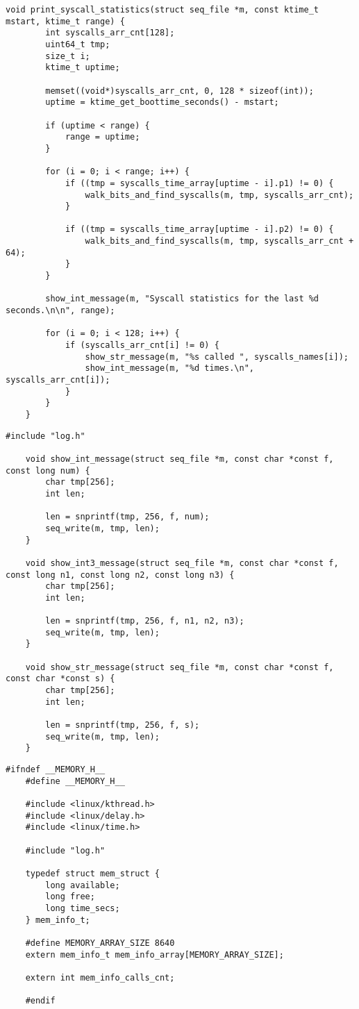 \begin{lstlisting}[caption={листинг файла stat.c}]
	void print_syscall_statistics(struct seq_file *m, const ktime_t mstart, ktime_t range) {
		int syscalls_arr_cnt[128];
		uint64_t tmp;
		size_t i;
		ktime_t uptime;
		
		memset((void*)syscalls_arr_cnt, 0, 128 * sizeof(int));
		uptime = ktime_get_boottime_seconds() - mstart;
		
		if (uptime < range) {
			range = uptime;
		}
		
		for (i = 0; i < range; i++) {
			if ((tmp = syscalls_time_array[uptime - i].p1) != 0) {
				walk_bits_and_find_syscalls(m, tmp, syscalls_arr_cnt);
			}
			
			if ((tmp = syscalls_time_array[uptime - i].p2) != 0) {
				walk_bits_and_find_syscalls(m, tmp, syscalls_arr_cnt + 64);
			}
		}
		
		show_int_message(m, "Syscall statistics for the last %d seconds.\n\n", range);
		
		for (i = 0; i < 128; i++) {
			if (syscalls_arr_cnt[i] != 0) {
				show_str_message(m, "%s called ", syscalls_names[i]);
				show_int_message(m, "%d times.\n", syscalls_arr_cnt[i]);
			}
		}
	}
\end{lstlisting}

\begin{lstlisting}[caption={листинг файла log.c}]
	#include "log.h"
	
	void show_int_message(struct seq_file *m, const char *const f, const long num) {
		char tmp[256];
		int len;
		
		len = snprintf(tmp, 256, f, num);
		seq_write(m, tmp, len);
	}
	
	void show_int3_message(struct seq_file *m, const char *const f, const long n1, const long n2, const long n3) {
		char tmp[256];
		int len;
		
		len = snprintf(tmp, 256, f, n1, n2, n3);
		seq_write(m, tmp, len);
	}
	
	void show_str_message(struct seq_file *m, const char *const f, const char *const s) {
		char tmp[256];
		int len;
		
		len = snprintf(tmp, 256, f, s);
		seq_write(m, tmp, len);
	}
\end{lstlisting}

\begin{lstlisting}[caption={листинг файла memory.h}]
	#ifndef __MEMORY_H__
	#define __MEMORY_H__
	
	#include <linux/kthread.h>
	#include <linux/delay.h>
	#include <linux/time.h>
	
	#include "log.h"
	
	typedef struct mem_struct {
		long available;
		long free;
		long time_secs;
	} mem_info_t;
	
	#define MEMORY_ARRAY_SIZE 8640
	extern mem_info_t mem_info_array[MEMORY_ARRAY_SIZE];
	
	extern int mem_info_calls_cnt;
	
	#endif
\end{lstlisting}

